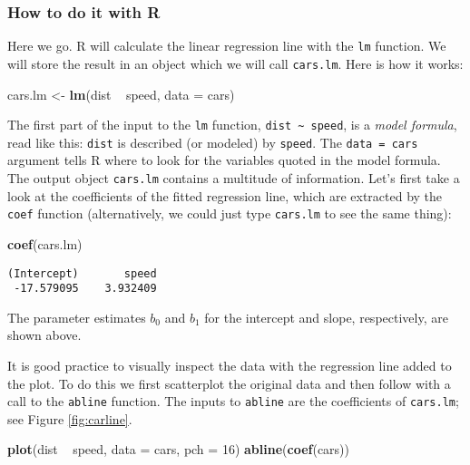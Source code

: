 \documentclass[]{book}
\newenvironment{Shaded}{\begin{snugshade}}{\end{snugshade}}
\newcommand{\KeywordTok}[1]{\textcolor[rgb]{0.13,0.29,0.53}{\textbf{{#1}}}}
\newcommand{\DataTypeTok}[1]{\textcolor[rgb]{0.13,0.29,0.53}{{#1}}}
\newcommand{\DecValTok}[1]{\textcolor[rgb]{0.00,0.00,0.81}{{#1}}}
\newcommand{\StringTok}[1]{\textcolor[rgb]{0.31,0.60,0.02}{{#1}}}
\newcommand{\NormalTok}[1]{{#1}}
\numberwithin{equation}{chapter}
\numberwithin{figure}{chapter}
\theoremstyle{plain}
\theoremstyle{definition}
\theoremstyle{remark}
\theoremstyle{definition}
\theoremstyle{definition}
\theoremstyle{remark}
\begin{document}
\subsubsection{How to do it with R}\label{how-to-do-it-with-r-47}

Here we go. R will calculate the linear regression line with the
\texttt{lm} function. We will store the result in an object which we
will call \texttt{cars.lm}. Here is how it works:

\begin{Shaded}
\begin{Highlighting}[]
\NormalTok{cars.lm <-}\StringTok{ }\KeywordTok{lm}\NormalTok{(dist ~}\StringTok{ }\NormalTok{speed, }\DataTypeTok{data =} \NormalTok{cars)}
\end{Highlighting}
\end{Shaded}

The first part of the input to the \texttt{lm} function,
\texttt{dist\ \textasciitilde{}\ speed}, is a \emph{model formula}, read
like this: \texttt{dist} is described (or modeled) by \texttt{speed}.
The \texttt{data\ =\ cars} argument tells R where to look for the
variables quoted in the model formula. The output object
\texttt{cars.lm} contains a multitude of information. Let's first take a
look at the coefficients of the fitted regression line, which are
extracted by the \texttt{coef} function (alternatively, we could just
type \texttt{cars.lm} to see the same thing):

\begin{Shaded}
\begin{Highlighting}[]
\KeywordTok{coef}\NormalTok{(cars.lm)}
\end{Highlighting}
\end{Shaded}

\begin{verbatim}
(Intercept)       speed 
 -17.579095    3.932409 
\end{verbatim}

The parameter estimates \(b_{0}\) and \(b_{1}\) for the intercept and
slope, respectively, are shown above.

It is good practice to visually inspect the data with the regression
line added to the plot. To do this we first scatterplot the original
data and then follow with a call to the \texttt{abline} function. The
inputs to \texttt{abline} are the coefficients of \texttt{cars.lm}; see
Figure \ref{fig:carline}.

\begin{Shaded}
\begin{Highlighting}[]
\KeywordTok{plot}\NormalTok{(dist ~}\StringTok{ }\NormalTok{speed, }\DataTypeTok{data =} \NormalTok{cars, }\DataTypeTok{pch =} \DecValTok{16}\NormalTok{)}
\KeywordTok{abline}\NormalTok{(}\KeywordTok{coef}\NormalTok{(cars))}
\end{Highlighting}
\end{Shaded}
\end{document}
